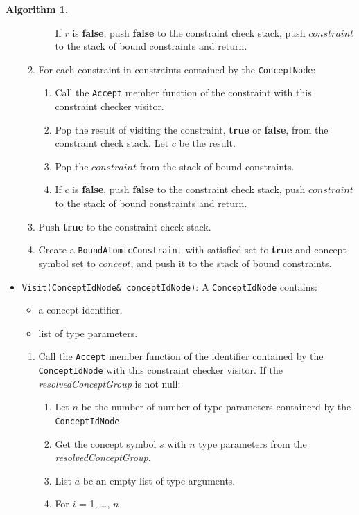 \documentclass[a4paper,oneside,11pt]{book}
\theoremstyle{definition}
\newtheorem{algo}{Algorithm}[section]
\begin{document}
\begin{algo}
\begin{itemize}
\begin{enumerate}
\begin{enumerate}
If $r$ is \textbf{false}, push \textbf{false} to the constraint check stack, push $constraint$ to the stack of bound constraints and return.
\end{enumerate}
\item
For each constraint in constraints contained by the \verb|ConceptNode|:
\begin{enumerate}
\item
Call the \verb|Accept| member function of the constraint with this constraint checker visitor.
\item
Pop the result of visiting the constraint, \textbf{true} or \textbf{false}, from the constraint check stack. Let $c$ be the result.
\item
Pop the $constraint$ from the stack of bound constraints.
\item
If $c$ is \textbf{false}, push \textbf{false} to the constraint check stack, push $constraint$ to the stack of bound constraints and return.
\end{enumerate}
\item
Push \textbf{true} to the constraint check stack.
\item
Create a \verb|BoundAtomicConstraint| with satisfied set to \textbf{true} and concept symbol set to $concept$, and push it to the stack of bound constraints.
\end{enumerate}
\item
\verb|Visit(ConceptIdNode& conceptIdNode)|:
A \verb|ConceptIdNode| contains:
\begin{itemize}
\item
a concept identifier.
\item
list of type parameters.
\end{itemize}
\begin{enumerate}
\item
Call the \verb|Accept| member function of the identifier contained by the \verb|ConceptIdNode| with this constraint checker visitor.
If the \emph{resolvedConceptGroup} is not null:
\begin{enumerate}
\item
Let $n$ be the number of number of type parameters containerd by the \verb|ConceptIdNode|.
\item
Get the concept symbol $s$ with $n$ type parameters from the \emph{resolvedConceptGroup}.
\item
List $a$ be an empty list of type arguments.
\item
For $i$ = 1, \ldots, $n$
\begin{enumerate}

\end{enumerate}
\end{enumerate}
\end{enumerate}
\end{itemize}
\end{algo}
\end{document}
